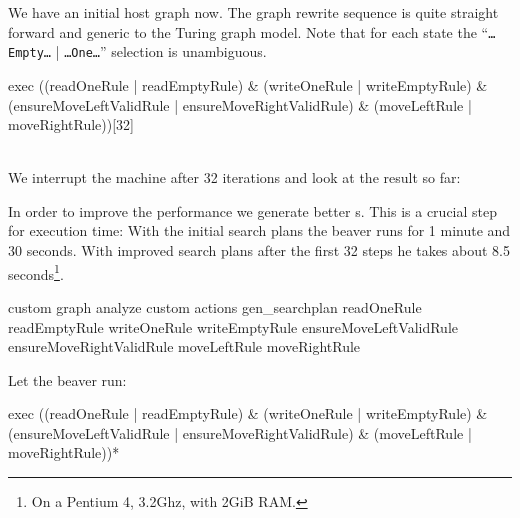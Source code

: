 We have an initial host graph now. The graph rewrite sequence is quite straight forward and generic to the Turing graph model. Note that for each state the ``\texttt{\dots Empty\dots} | \texttt{\dots One\dots}'' selection is unambiguous.
\begin{grshell}[firstnumber=last]
  exec ((readOneRule | readEmptyRule) & (writeOneRule | writeEmptyRule) & (ensureMoveLeftValidRule | ensureMoveRightValidRule) & (moveLeftRule | moveRightRule))[32]

\end{grshell}
\quad\\We interrupt the machine after 32 iterations and look at the result so far:
\begin{center}
\end{center}
In order to improve the performance we generate better s. This is a crucial step for execution time: With the initial search plans the beaver runs for 1 minute and 30 seconds. With improved search plans after the first 32 steps he takes about 8.5 seconds\footnote{On a Pentium 4, 3.2Ghz, with 2GiB RAM.}.
\begin{grshell}[firstnumber=last]
custom graph analyze
custom actions gen_searchplan readOneRule readEmptyRule writeOneRule writeEmptyRule ensureMoveLeftValidRule ensureMoveRightValidRule moveLeftRule moveRightRule

\end{grshell}

Let the beaver run:
\begin{grshell}[firstnumber=last]
  exec ((readOneRule | readEmptyRule) & (writeOneRule | writeEmptyRule) & (ensureMoveLeftValidRule | ensureMoveRightValidRule) & (moveLeftRule | moveRightRule))*
\end{grshell}


